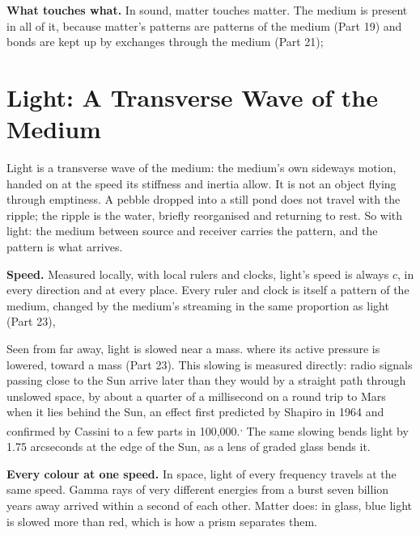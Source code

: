 \textbf{What touches what.} In sound, matter touches matter. The medium is present in all of it, because matter's patterns are patterns of the medium (Part 19) and bonds are kept up by exchanges through the medium (Part 21); 

\section{Light: A Transverse Wave of the Medium}

\begin{hypbar}
Light is a transverse wave of the medium: the medium's own sideways motion, handed on at the speed its stiffness and inertia allow. It is not an object flying through emptiness. A pebble dropped into a still pond does not travel with the ripple; the ripple is the water, briefly reorganised and returning to rest. So with light: the medium between source and receiver carries the pattern, and the pattern is what arrives.
\end{hypbar}

\textbf{Speed.} Measured locally, with local rulers and clocks, light's speed is always $c$, in every direction and at every place. Every ruler and clock is itself a pattern of the medium, changed by the medium's streaming in the same proportion as light (Part 23), 

Seen from far away, light is slowed near a mass.  where its active pressure is lowered, toward a mass (Part 23). This slowing is measured directly: radio signals passing close to the Sun arrive later than they would by a straight path through unslowed space, by about a quarter of a millisecond on a round trip to Mars when it lies behind the Sun, an effect first predicted by Shapiro in 1964 and confirmed by Cassini to a few parts in 100,000.\textsuperscript{,} The same slowing bends light by 1.75 arcseconds at the edge of the Sun, as a lens of graded glass bends it.

\textbf{Every colour at one speed.} In space, light of every frequency travels at the same speed. Gamma rays of very different energies from a burst seven billion years away arrived within a second of each other.  Matter does: in glass, blue light is slowed more than red, which is how a prism separates them.

